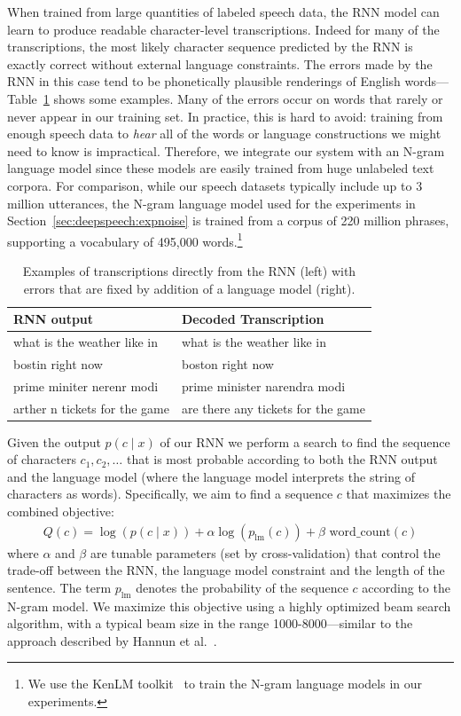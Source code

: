 When trained from large quantities of labeled speech data, the RNN model can
learn to produce readable character-level transcriptions. Indeed for many of
the transcriptions, the most likely character sequence predicted by the RNN is
exactly correct without external language constraints. The errors made by the
RNN in this case tend to be phonetically plausible renderings of English
words---Table~\ref{table:deepspeech:max_decoded} shows some examples. Many of
the errors occur on words that rarely or never appear in our training set. In
practice, this is hard to avoid:  training from enough speech data to
\emph{hear} all of the words or language constructions we might need to know is
impractical.  Therefore, we integrate our system with an N-gram language model
since these models are easily trained from huge unlabeled text corpora. For
comparison, while our speech datasets typically include up to 3 million
utterances, the N-gram language model used for the experiments in
Section~\ref{sec:deepspeech:expnoise} is trained from a corpus of 220 million
phrases, supporting a vocabulary of 495,000 words.\footnote{We use the KenLM
toolkit~\cite{heafield2013} to train the N-gram language models in our
experiments.} 

\begin{table}[h]
\centering
\begin{tabular}{l | l}
\toprule
RNN output  & Decoded Transcription \\
\midrule
\rule{0pt}{2ex}
what is the weather like in & what is the weather like in \\
\rule{0pt}{0.1ex}
bostin right now       & boston right now \\
\rule{0pt}{4ex}
prime miniter nerenr modi   & prime minister narendra modi \\ 
\rule{0pt}{4ex}
arther n tickets for the game  & are there any tickets for the game \\ 
\bottomrule
\end{tabular}
\caption{Examples of transcriptions directly from the RNN (left) with errors
         that are fixed by addition of a language model (right).}
\label{table:deepspeech:max_decoded}
\end{table}

Given the output $p(c \mid x)$ of our RNN we perform a search to find the
sequence of characters $c_1,c_2,\ldots$ that is most probable according to both
the RNN output and the language model (where the language model interprets the
string of characters as words). Specifically, we aim to find a sequence $c$
that maximizes the combined objective:
\begin{align*}
    Q(c) = \log(p(c \mid x)) + \alpha \log(p_{\text{lm}}(c)) + \beta \textrm{ word\_count}(c)
\end{align*}
where $\alpha$ and $\beta$ are tunable parameters (set by cross-validation)
that control the trade-off between the RNN, the language model constraint and
the length of the sentence. The term $p_{\text{lm}}$ denotes the
probability of the sequence $c$ according to the N-gram model. We maximize
this objective using a highly optimized beam search algorithm, with a typical
beam size in the range 1000-8000---similar to the approach described by Hannun
et al.~\cite{hannun2014firstpass}.
